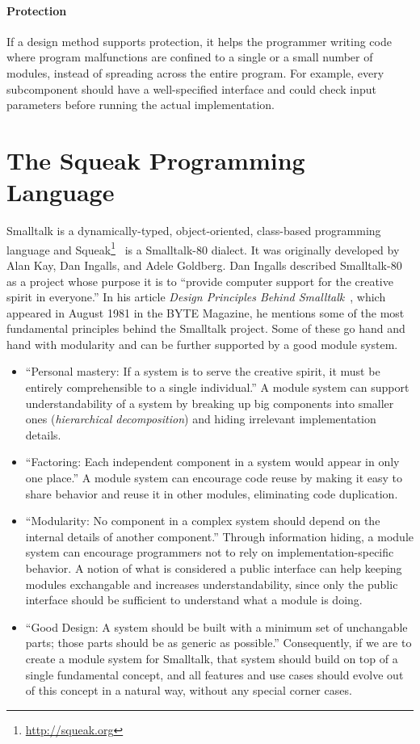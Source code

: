 \paragraph{Protection}
If a design method supports protection, it helps the programmer writing code where program malfunctions are confined to a single or a small number of modules, instead of spreading across the entire program. For example, every subcomponent should have a well-specified interface and could check input parameters before running the actual implementation.

\section{The Squeak Programming Language}
Smalltalk is a dynamically-typed, object-oriented, class-based programming language and Squeak\footnote{\url{http://squeak.org}}~\cite{Ingalls:1997:BFS:263698.263754} is a Smalltalk-80 dialect. It was originally developed by Alan Kay, Dan Ingalls, and Adele Goldberg. Dan Ingalls described Smalltalk-80 as a project whose purpose it is to ``provide computer support for the creative spirit in everyone.'' In his article \emph{Design Principles Behind Smalltalk}~\cite{Inga81a}, which appeared in August 1981 in the BYTE Magazine, he mentions some of the most fundamental principles behind the Smalltalk project. Some of these go hand and hand with modularity and can be further supported by a good module system.

\begin{itemize}
	\item ``Personal mastery: If a system is to serve the creative spirit, it must be entirely comprehensible to a single individual.'' A module system can support understandability of a system by breaking up big components into smaller ones (\emph{hierarchical decomposition}) and hiding irrelevant implementation details.
	\item ``Factoring: Each independent component in a system would appear in only one place.'' A module system can encourage code reuse by making it easy to share behavior and reuse it in other modules, eliminating code duplication. %
	\item ``Modularity: No component in a complex system should depend on the internal details of another component.'' Through information hiding, a module system can encourage programmers not to rely on implementation-specific behavior. A notion of what is considered a public interface can help keeping modules exchangable and increases understandability, since only the public interface should be sufficient to understand what a module is doing.
	\item ``Good Design: A system should be built with a minimum set of unchangable parts; those parts should be as generic as possible.'' Consequently, if we are to create a module system for Smalltalk, that system should build on top of a single fundamental concept, and all features and use cases should evolve out of this concept in a natural way, without any special corner cases.
\end{itemize}

